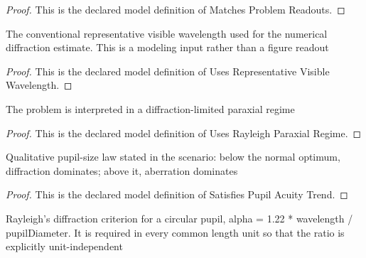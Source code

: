 \begin{proof}
  This is the declared model definition of Matches Problem Readouts.
\end{proof}
\begin{definition}
  \label{def:physics:phyx-mini-0075:phyxminiproblems-problemphyxmini0075-usesrepresentativevisiblewavelength}
  The conventional representative visible wavelength used for the numerical diffraction estimate. This is a modeling input rather than a figure readout
\end{definition}
\begin{proof}
  This is the declared model definition of Uses Representative Visible Wavelength.
\end{proof}
\begin{definition}
  \label{def:physics:phyx-mini-0075:phyxminiproblems-problemphyxmini0075-usesrayleighparaxialregime}
  The problem is interpreted in a diffraction-limited paraxial regime
\end{definition}
\begin{proof}
  This is the declared model definition of Uses Rayleigh Paraxial Regime.
\end{proof}
\begin{definition}
  \label{def:physics:phyx-mini-0075:phyxminiproblems-problemphyxmini0075-satisfiespupilacuitytrend}
  Qualitative pupil-size law stated in the scenario: below the normal optimum, diffraction dominates; above it, aberration dominates
\end{definition}
\begin{proof}
  This is the declared model definition of Satisfies Pupil Acuity Trend.
\end{proof}
\begin{definition}
  \label{def:physics:phyx-mini-0075:phyxminiproblems-problemphyxmini0075-satisfiesrayleighcriterion}
  Rayleigh's diffraction criterion for a circular pupil, alpha = 1.22 * wavelength / pupilDiameter. It is required in every common length unit so that the ratio is explicitly unit-independent
\end{definition}
